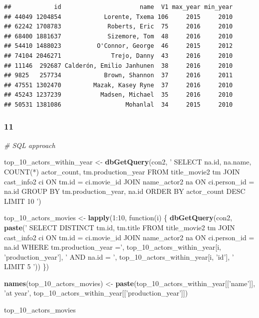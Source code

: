 \documentclass[]{article}
\newenvironment{Shaded}{\begin{snugshade}}{\end{snugshade}}
\newcommand{\KeywordTok}[1]{\textcolor[rgb]{0.13,0.29,0.53}{\textbf{{#1}}}}
\newcommand{\DecValTok}[1]{\textcolor[rgb]{0.00,0.00,0.81}{{#1}}}
\newcommand{\StringTok}[1]{\textcolor[rgb]{0.31,0.60,0.02}{{#1}}}
\newcommand{\CommentTok}[1]{\textcolor[rgb]{0.56,0.35,0.01}{\textit{{#1}}}}
\newcommand{\NormalTok}[1]{{#1}}
\begin{document}
\begin{verbatim}
##            id                      name  V1 max_year min_year
## 44049 1204854            Lorente, Txema 106     2015     2010
## 62242 1708783             Roberts, Eric  75     2016     2010
## 68400 1881637             Sizemore, Tom  48     2016     2010
## 54410 1488023          O'Connor, George  46     2015     2012
## 74104 2046271              Trejo, Danny  43     2016     2010
## 11146  292687 Calderón, Emilio Janhunen  38     2016     2010
## 9825   257734            Brown, Shannon  37     2016     2011
## 47551 1302470         Mazak, Kasey Ryne  37     2016     2010
## 45243 1237239           Madsen, Michael  35     2016     2010
## 50531 1381086                  Mohanlal  34     2015     2010
\end{verbatim}

\subsubsection{11}\label{section}

\begin{Shaded}
\begin{Highlighting}[]
\CommentTok{# SQL approach}

\NormalTok{top_10_actors_within_year <-}\StringTok{ }
\StringTok{  }\KeywordTok{dbGetQuery}\NormalTok{(con2, }\StringTok{'}
\StringTok{             SELECT na.id, na.name, COUNT(*) actor_count, tm.production_year}
\StringTok{             FROM title_movie2 tm JOIN cast_info2 ci ON tm.id = ci.movie_id }
\StringTok{                JOIN name_actor2 na ON ci.person_id = na.id}
\StringTok{             GROUP BY tm.production_year, na.id}
\StringTok{             ORDER BY actor_count DESC}
\StringTok{             LIMIT 10}
\StringTok{             '}\NormalTok{)}

\NormalTok{top_10_actors_movies <-}
\StringTok{  }\KeywordTok{lapply}\NormalTok{(}\DecValTok{1}\NormalTok{:}\DecValTok{10}\NormalTok{, function(i) \{}
    \KeywordTok{dbGetQuery}\NormalTok{(con2, }\KeywordTok{paste}\NormalTok{(}\StringTok{'}
\StringTok{               SELECT DISTINCT tm.id, tm.title}
\StringTok{               FROM title_movie2 tm JOIN cast_info2 ci ON tm.id = ci.movie_id }
\StringTok{                   JOIN name_actor2 na ON ci.person_id = na.id}
\StringTok{               WHERE tm.production_year ='}\NormalTok{, top_10_actors_within_year[i, }\StringTok{'production_year'}\NormalTok{], }\StringTok{' }
\StringTok{                   AND na.id = '}\NormalTok{, top_10_actors_within_year[i, }\StringTok{'id'}\NormalTok{], }\StringTok{'}
\StringTok{               LIMIT 5}
\StringTok{               '}\NormalTok{))}
  \NormalTok{\})}

\KeywordTok{names}\NormalTok{(top_10_actors_movies) <-}\StringTok{ }\KeywordTok{paste}\NormalTok{(top_10_actors_within_year[[}\StringTok{'name'}\NormalTok{]], }\StringTok{'at year'}\NormalTok{, }
                                     \NormalTok{top_10_actors_within_year[[}\StringTok{'production_year'}\NormalTok{]])}

\NormalTok{top_10_actors_movies}
\end{Highlighting}
\end{Shaded}
\end{document}
